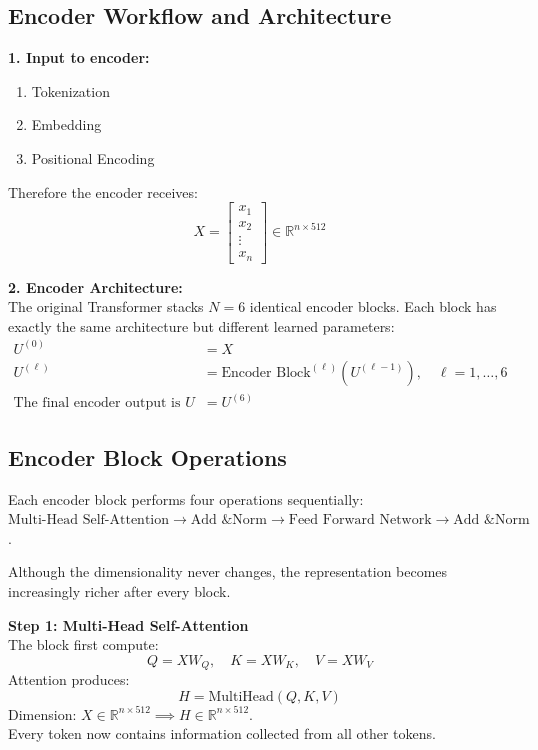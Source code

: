 \subsection{Encoder Workflow and Architecture}
\textbf{1. Input to encoder:}
\begin{enumerate}
    \item Tokenization
    \item Embedding
    \item Positional Encoding
\end{enumerate}

Therefore the encoder receives:
\begin{equation}
X = \begin{bmatrix} x_1 \\ x_2 \\ \vdots \\ x_n \end{bmatrix} \in \mathbb{R}^{n \times 512}
\end{equation}

\textbf{2. Encoder Architecture:} \\
The original Transformer stacks $N = 6$ identical encoder blocks. Each block has exactly the same architecture but different learned parameters:
\begin{align}
U^{(0)} &= X \\
U^{(\ell)} &= \text{Encoder Block}^{(\ell)}\left(U^{(\ell-1)}\right), \quad \ell = 1, \dots, 6 \\
\text{The final encoder output is } U &= U^{(6)}
\end{align}

\subsection{Encoder Block Operations}
Each encoder block performs four operations sequentially: \\
$\text{Multi-Head Self-Attention} \longrightarrow \text{Add \& Norm} \longrightarrow \text{Feed Forward Network} \longrightarrow \text{Add \& Norm}$.

Although the dimensionality never changes, the representation becomes increasingly richer after every block.

\textbf{Step 1: Multi-Head Self-Attention} \\
The block first compute:
\begin{equation}
Q = X W_Q, \quad K = X W_K, \quad V = X W_V
\end{equation}
Attention produces:
\begin{equation}
H = \text{MultiHead}(Q, K, V)
\end{equation}
Dimension: $X \in \mathbb{R}^{n \times 512} \implies H \in \mathbb{R}^{n \times 512}$. \\
Every token now contains information collected from all other tokens.

